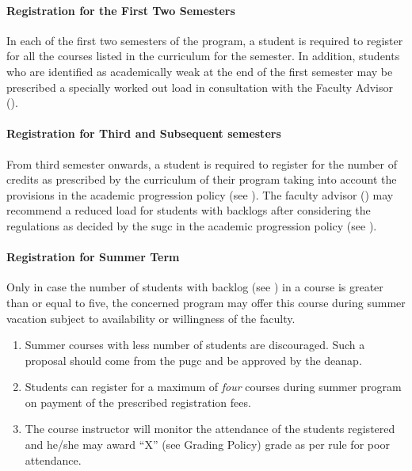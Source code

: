 \paragraph{Registration for the First Two Semesters \label{lab:First Year Registration}}

In each of the first two semesters of the program, a student is required to register for all the courses listed in the curriculum for the semester. In addition, students who are identified as academically weak at the end of the first semester may be prescribed a specially worked out load in consultation with the Faculty Advisor ().

\paragraph{Registration for Third and Subsequent semesters}

From third semester onwards, a student is required to register for the number of credits as prescribed by the curriculum of their program taking into account the provisions in the academic progression policy (see ). The faculty advisor () may recommend a reduced load for \glspl{student} with backlogs after considering the regulations as decided by the \acrshort{sugc} in the academic progression policy (see ).

\paragraph{Registration for Summer Term} Only in case the number of \glspl{student} with backlog (see ) in a course is greater than or equal to five, the concerned program may offer this course during summer vacation subject to availability or willingness of the \gls{faculty}.

\begin{enumerate}[leftmargin=15mm]
    \item Summer courses with less number of \glspl{student} are discouraged. Such a proposal should come from the \acrshort{pugc} and be approved by the \acrshort{deanap}.
    \item Students can register for a maximum of \textit{four} courses during summer program on payment of the prescribed registration fees.
    \item The course instructor will monitor the attendance of the students registered and he/she may award “X” (see Grading Policy) grade as per rule for poor attendance.
\end{enumerate}

